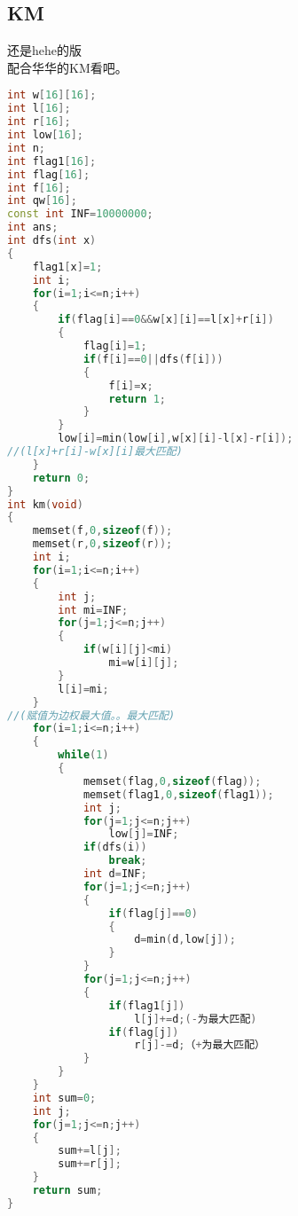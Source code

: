 \subsection{KM}
    还是hehe的版\\
    配合华华的KM看吧。\\
    \begin{lstlisting}[language=c++]
int w[16][16];
int l[16];
int r[16];
int low[16];
int n;
int flag1[16];
int flag[16];
int f[16];
int qw[16];
const int INF=10000000;
int ans;
int dfs(int x)
{
	flag1[x]=1;
	int i;
	for(i=1;i<=n;i++)
	{
		if(flag[i]==0&&w[x][i]==l[x]+r[i])
		{
			flag[i]=1;
			if(f[i]==0||dfs(f[i]))
			{
				f[i]=x;
				return 1;
			}
		}
		low[i]=min(low[i],w[x][i]-l[x]-r[i]);
//(l[x]+r[i]-w[x][i]最大匹配)
	}
	return 0;
}
int km(void)
{
	memset(f,0,sizeof(f));
	memset(r,0,sizeof(r));
	int i;
	for(i=1;i<=n;i++)
	{
		int j;
		int mi=INF;
		for(j=1;j<=n;j++)
		{
			if(w[i][j]<mi)
				mi=w[i][j];
		}
		l[i]=mi;
	}
//(赋值为边权最大值。。最大匹配)
	for(i=1;i<=n;i++)
	{
		while(1)
		{
			memset(flag,0,sizeof(flag));
			memset(flag1,0,sizeof(flag1));
			int j;
			for(j=1;j<=n;j++)
				low[j]=INF;
			if(dfs(i))
				break;
			int d=INF;
			for(j=1;j<=n;j++)
			{
				if(flag[j]==0)
				{
					d=min(d,low[j]);
				}
			}
			for(j=1;j<=n;j++)
			{
				if(flag1[j])
					l[j]+=d;(-为最大匹配)
				if(flag[j])
					r[j]-=d;（+为最大匹配）
			}
		}
	}
	int sum=0;
	int j;
	for(j=1;j<=n;j++)
	{
		sum+=l[j];
		sum+=r[j];
	}
	return sum;
}
    \end{lstlisting}
